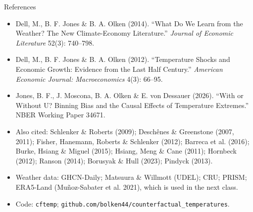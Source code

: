 \documentclass[aspectratio=169,10pt]{beamer}
\begin{document}
\begin{frame}{References}
  \footnotesize
  \begin{itemize}
    \item Dell, M., B. F. Jones \& B. A. Olken (2014). ``What Do We Learn from the
          Weather? The New Climate-Economy Literature.''
          \emph{Journal of Economic Literature} 52(3): 740--798.
    \item Dell, M., B. F. Jones \& B. A. Olken (2012). ``Temperature Shocks and
          Economic Growth: Evidence from the Last Half Century.''
          \emph{American Economic Journal: Macroeconomics} 4(3): 66--95.
    \item Jones, B. F., J. Moscona, B. A. Olken \& E. von Dessauer (2026). ``With or
          Without U? Binning Bias and the Causal Effects of Temperature Extremes.''
          NBER Working Paper 34671.
    \item Also cited: Schlenker \& Roberts (2009); Desch\^enes \& Greenstone (2007,
          2011); Fisher, Hanemann, Roberts \& Schlenker (2012); Barreca et al. (2016);
          Burke, Hsiang \& Miguel (2015); Hsiang, Meng \& Cane (2011); Hornbeck (2012);
          Ranson (2014); Borusyak \& Hull (2023); Pindyck (2013).
    \item Weather data: GHCN-Daily; Matsuura \& Willmott (UDEL); CRU; PRISM; ERA5-Land
          (Mu\~noz-Sabater et al. 2021), which is used in the next class.
    \item Code: \texttt{cftemp};
          \texttt{github.com/bolken44/counterfactual\_temperatures}.
  \end{itemize}
  \vfill
\end{frame}
\end{document}
